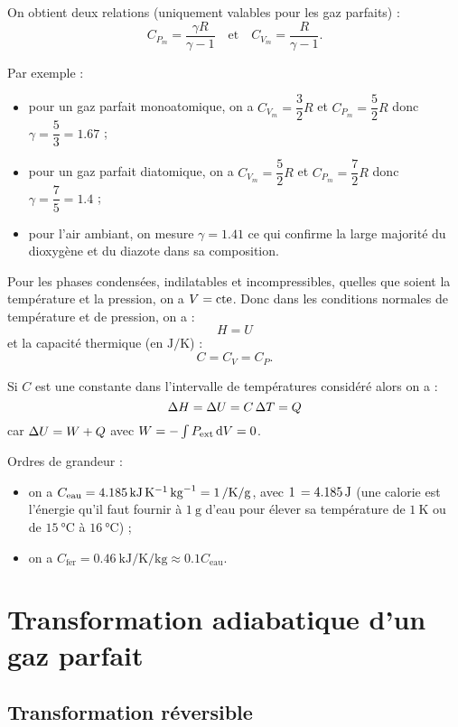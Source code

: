 On obtient deux relations (uniquement valables pour les gaz parfaits) : \[C_{P_m}=\dfrac{\gamma R}{\gamma-1}\quad\text{et}\quad C_{V_m}=\dfrac{R}{\gamma-1}.\]

Par exemple : \begin{itemize}
\item pour un gaz parfait monoatomique, on a \(C_{V_m}=\dfrac{3}{2}R\) et \(C_{P_m}=\dfrac{5}{2}R\) donc \(\gamma=\dfrac{5}{3}=\num{1.67}\) ;
\item pour un gaz parfait diatomique, on a \(C_{V_m}=\dfrac{5}{2}R\) et \(C_{P_m}=\dfrac{7}{2}R\) donc \(\gamma=\dfrac{7}{5}=\num{1.4}\) ;
\item pour l'air ambiant, on mesure \(\gamma=\num{1.41}\) ce qui confirme la large majorité du dioxygène et du diazote dans sa composition. \\
\end{itemize}

Pour les phases condensées, \ie indilatables et incompressibles, quelles que soient la température et la pression, on a \(V=\mathrm{cte}\). Donc dans les conditions normales de température et de pression, on a : \[H=U\] et la capacité thermique (en \(\unit{\joule\per\kelvin}\)) : \[C=C_V=C_P.\]

Si \(C\) est une constante dans l'intervalle de températures considéré alors on a : \[\adif{H}=\adif{U}=C\adif{T}=Q\] car \(\adif{U}=W+Q\) avec \(W=-\int P_\ext\odif{V}=0\).

Ordres de grandeur : \begin{itemize}
\item on a \(C_\text{eau}=\SI{4.185}{\kilo\joule\per\kelvin\per\kilo\gram}=\SI{1}{\cal\per\kelvin\per\gram}\), avec \(\SI{1}{\cal}=\SI{4.185}{\joule}\) (une calorie est l'énergie qu'il faut fournir à \(\SI{1}{\gram}\) d'eau pour élever sa température de \(\SI{1}{\kelvin}\) ou de \(\SI{15}{\degreeCelsius}\) à \(\SI{16}{\degreeCelsius}\)) ;
\item on a \(C_\text{fer}=\SI{0.46}{\kilo\joule\per\kelvin\per\kilo\gram}\approx\num{0.1}C_\text{eau}\).
\end{itemize}

\section{Transformation adiabatique d'un gaz parfait}

\subsection{Transformation réversible}

